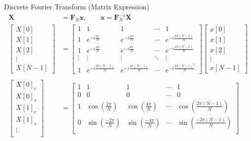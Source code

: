 \begin{frame}{Discrete Fourier Transform (Matrix Expression)}
	\vspace{-0.5cm}
		\begin{align*}
			\mathbf{X} &= \mathbf{F}_N \mathbf{x}, \qquad \mathbf{x} = \mathbf{F}^{-1}_N \mathbf{X} \\
			\begin{bmatrix}
				X[0]\\
				X[1]\\
				X[2]\\
				\vdots\\
				X[N-1]
			\end{bmatrix}
			&=
			\begin{bmatrix}
				1 & 1 & 1 & \cdots & 1\\
				1 & e^{-i\frac{2\pi}{N}} & e^{-i\frac{4\pi}{N}} & \cdots & e^{-i\frac{2\pi(N-1)}{N}}\\
				1 & e^{-i\frac{4\pi}{N}} & e^{-i\frac{8\pi}{N}} & \cdots & e^{-i\frac{4\pi(N-1)}{N}}\\
				\vdots & \vdots & \vdots & \ddots & \vdots\\
				1 & e^{-i\frac{2\pi(N-1)}{N}} &
				e^{-i\frac{4\pi(N-1)}{N}} &
				\cdots &
				e^{-i\frac{2\pi(N-1)^2}{N}}
			\end{bmatrix}
			\begin{bmatrix}
				x[0]\\
				x[1]\\
				x[2]\\
				\vdots\\
				x[N-1]
			\end{bmatrix} \\
			\\[-0.4cm]
			\begin{bmatrix}
				X[0]_c\\
				X[0]_s\\
				X[1]_c\\
				X[1]_s\\
				\vdots\\
			\end{bmatrix}
			&=
			\begin{bmatrix}
				1 & 1 & 1 & \cdots & 1\\
				0 & 0 & 0 & \cdots & 0\\
				1 & \cos(\frac{2\pi}{N}) & \cos(\frac{4\pi}{N}) & \cdots & \cos(\frac{2\pi(N-1)}{N})\\
				0 & \sin(\frac{-2\pi}{N}) & \sin(\frac{-4\pi}{N}) & \cdots & \sin(\frac{-2\pi(N-1)}{N})\\

\end{bmatrix}
\end{align*}
\end{frame}
